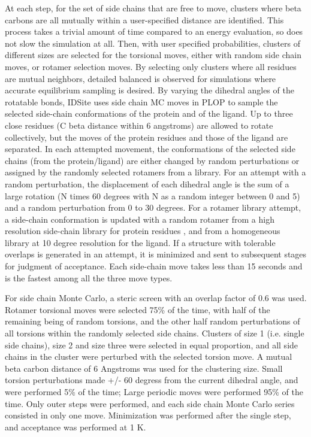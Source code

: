 At each step, for the set of side chains that are free to move, clusters where beta carbons are all mutually within a user-specified distance are identified.
This process takes a trivial amount of time compared to an energy evaluation, so does not slow the simulation at all.
Then, with user specified probabilities, clusters of different sizes are selected for the torsional moves, either with random side chain moves, or rotamer selection moves.
By selecting only clusters where all residues are mutual neighbors, detailed balanced is observed for simulations where accurate equilibrium sampling is desired.
By varying the dihedral angles of the rotatable bonds, IDSite uses side chain MC moves in PLOP to sample the selected side-chain conformations of the protein and of the ligand.
Up to three close residues (C beta distance within 6 angstroms) are allowed to rotate collectively, but the moves of the protein residues and those of the ligand are separated.
In each attempted movement, the conformations of the selected side chains (from the protein/ligand) are either changed by random perturbations or assigned by the randomly selected rotamers from a library.
For an attempt with a random perturbation, the displacement of each dihedral angle is the sum of a large rotation (N times 60 degrees with N as a random integer between 0 and 5) and a random perturbation from 0 to 30 degrees.
For a rotamer library attempt, a side-chain conformation is updated with a random rotamer from a high resolution side-chain library for protein residues \cite{xiang2001extending}, and from a homogeneous library at 10 degree resolution for the ligand.
If a structure with tolerable overlaps is generated in an attempt, it is minimized and sent to subsequent stages for judgment of acceptance.
Each side-chain move takes less than 15 seconds and is the fastest among all the three move types.

For side chain Monte Carlo, a steric screen with an overlap factor of 0.6 was used.
Rotamer torsional moves were selected 75\% of the time, with half of the remaining being of random torsions, and the other half random perturbations of all torsions within the randomly selected side chains.
Clusters of size 1 (i.e. single side chains), size 2 and size three were selected in equal proportion, and all side chains in the cluster were perturbed with the selected torsion move.
A mutual beta carbon distance of 6 Angstroms was used for the clustering size.
Small torsion perturbations made +/- 60 degress from the current dihedral angle, and were performed 5\% of the time; Large periodic moves were performed 95\% of the time.
Only outer steps were performed, and each side chain Monte Carlo series consisted in only one move.
Minimization was performed after the single step, and acceptance was performed at 1 K.

